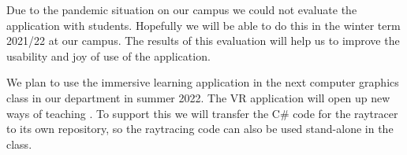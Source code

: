 \documentclass{VRARWorkshop}
\begin{document}
Due to the pandemic situation on our campus we could not evaluate the application with students.
Hopefully we will be able to do this in the winter term 2021/22 at our campus.
The results of this evaluation will help us to improve the usability and joy of use of the application.

We plan to use the immersive learning application in the next computer graphics class in our department
in summer 2022. The VR application will open up new ways of teaching \cite{ganovelli_08, vitsas_20}.
To support this we will transfer the C\# code for the raytracer to its own repository, so the raytracing code
can also be used stand-alone in the class.

\VRARsetbibstyle

\end{document}
